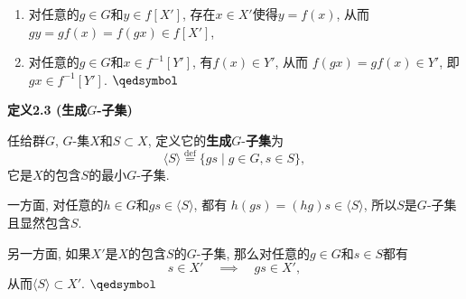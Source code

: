 \documentclass[UTF8]{ctexart}
\begin{document}

\begin{enumerate}
    \item 对任意的$g\in G$和$y\in f[X']$, 存在$x\in X'$使得$y=f(x)$, 从而
    $gy=gf(x)=f(gx)\in f[X']$,
    \item 对任意的$g\in G$和$x\in f^{-1}[Y']$, 有$f(x)\in Y'$, 从而
    $f(gx)=gf(x)\in Y'$, 即$gx\in f^{-1}[Y']$. \hfill $\qedsymbol$
\end{enumerate}

\vspace{10pt}

\hypertarget{sec:定义2.3}{}
\noindent\textbf{定义2.3 (生成$G$-子集)}

任给群$G$, $G$-集$X$和$S\subset X$, 定义它的\textbf{生成}$G$-\textbf{子集}为
\[
    \langle S\rangle\overset{\mathrm{def}}{=}\{gs\mid g\in G,s\in S\},
\]
它是$X$的包含$S$的最小$G$-子集.


一方面, 对任意的$h\in G$和$gs\in\langle S\rangle$, 都有
$h(gs)=(hg)s\in\langle S\rangle$, 所以$S$是$G$-子集且显然包含$S$.

另一方面, 如果$X'$是$X$的包含$S$的$G$-子集, 那么对任意的$g\in G$和$s\in S$都有
\[
    s\in X'\quad\implies\quad gs\in X',
\]
从而$\langle S\rangle\subset X'$. \hfill $\qedsymbol$
\end{document}
